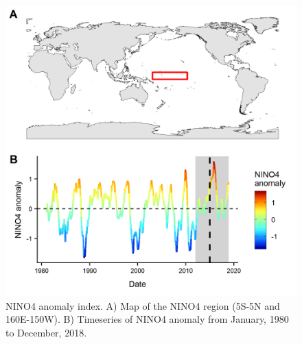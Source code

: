 \documentclass[12pt]{article}
\begin{document}
\begin{figure}
\centering
\includegraphics{img/nino_plot.png}
\caption{\label{fig:nino_plot}NINO4 anomaly index. A) Map of the NINO4 region (5S-5N and 160E-150W). B) Timeseries of NINO4 anomaly from January, 1980 to December, 2018.}
\end{figure}

\clearpage
\end{document}
